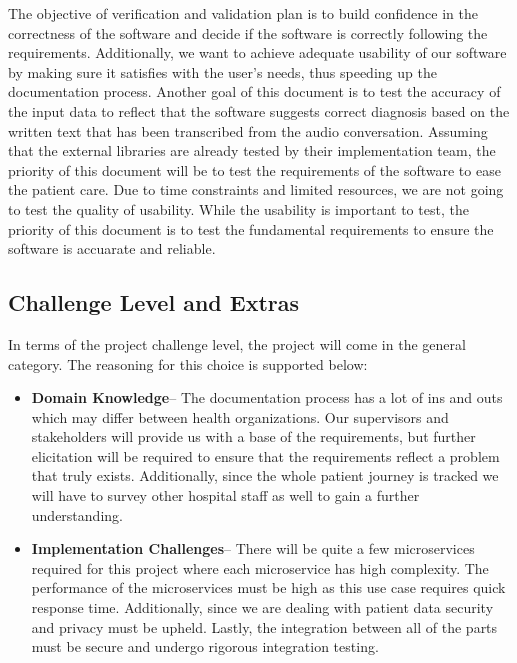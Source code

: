\documentclass[12pt, titlepage]{article}
\begin{document}
The objective of verification and validation plan is to build confidence in the correctness of the software and decide if the software is correctly following the requirements. Additionally, we want to achieve adequate usability of our software by making sure it satisfies with the user's needs, thus speeding up the documentation process. Another goal of this document is to test the accuracy of the input data to reflect that the software suggests correct diagnosis based on the written text that has been transcribed from the audio conversation. Assuming that the external libraries are already tested by their implementation team, the priority of this document will be to test the requirements of the software to ease the patient care. Due to time constraints and limited resources, we are not going to test the quality of usability. While the usability is important to test, the priority of this document is to test the fundamental requirements to ensure the software is accuarate and reliable. 

\subsection{Challenge Level and Extras}

In terms of the project challenge level, the project will come in the general category. The reasoning for this choice is supported below:

\begin{itemize}
  \item\textbf{Domain Knowledge}-- The documentation process has a lot of ins and outs which may differ between health organizations. Our supervisors and stakeholders will provide us with a base of the requirements, but further elicitation will be required to ensure that the requirements reflect a problem that truly exists. Additionally, since the whole patient journey is tracked we will have to survey other hospital staff as well to gain a further understanding. 
  \item\textbf{Implementation Challenges}-- There will be quite a few microservices required for this project where each microservice has high complexity. The performance of the microservices must be high as this use case requires quick response time. Additionally, since we are dealing with patient data security and privacy must be upheld. Lastly, the integration between all of the parts must be secure and undergo rigorous integration testing.
\end{itemize}
\end{document}
